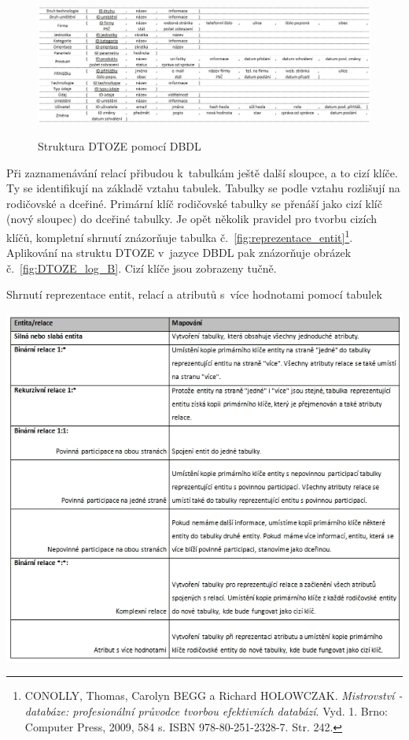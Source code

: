 \documentclass[11pt,a4paper]{article}
\begin{document}
\begin{figure}[H] 
\centering 
\caption{Struktura DTOZE pomocí DBDL} 
\includegraphics[scale=0.43]{DTOZE_log_A} 
\label{fig:DTOZE_log_A}
\end{figure} 

Při zaznamenávání relací přibudou k~tabulkám ještě další sloupce, a to cizí klíče.  Ty se identifikují na základě vztahu tabulek. Tabulky se podle vztahu rozlišují na rodičovské a dceřiné. Primární klíč rodičovské tabulky se přenáší jako cizí klíč (nový sloupec) do dceřiné tabulky. Je opět několik pravidel pro tvorbu cizích klíčů, kompletní shrnutí znázorňuje tabulka č.~\ref{fig:reprezentace_entit}\footnote{CONOLLY, Thomas, Carolyn BEGG a Richard HOLOWCZAK. \textit{Mistrovství - databáze: profesionální průvodce tvorbou efektivních databází}. Vyd. 1. Brno: Computer Press, 2009, 584 s. ISBN 978-80-251-2328-7. Str. 242.}. Aplikování na struktu DTOZE v~jazyce DBDL pak znázorňuje obrázek č.~\ref{fig:DTOZE_log_B}. Cizí klíče jsou zobrazeny tučně.

\begin{table}[H] 
\centering 
\caption{Shrnutí reprezentace entit, relací a atributů s~více hodnotami pomocí tabulek} 
\includegraphics[scale=0.6]{vztahy} 
\label{fig:reprezentace_entit}
\end{table} 
\end{document}
